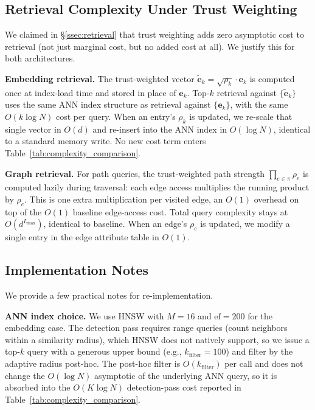 \subsection{Retrieval Complexity Under Trust Weighting}
\label{app:retrieval_complexity}

We claimed in \S\ref{ssec:retrieval} that trust weighting adds zero
asymptotic cost to retrieval (not just marginal cost, but no added
cost at all). We justify this for both architectures.

\textbf{Embedding retrieval.}
The trust-weighted vector $\tilde{\mathbf{e}}_k = \sqrt{\rho_k} \cdot
\mathbf{e}_k$ is computed once at index-load time and stored in place
of $\mathbf{e}_k$. Top-$k$ retrieval against
$\{\tilde{\mathbf{e}}_k\}$ uses the same ANN index structure as
retrieval against $\{\mathbf{e}_k\}$, with the same $O(k \log N)$
cost per query. When an entry's $\rho_k$ is updated, we re-scale that
single vector in $O(d)$ and re-insert into the ANN index in $O(\log
N)$, identical to a standard memory write. No new cost term enters
Table~\ref{tab:complexity_comparison}.

\textbf{Graph retrieval.}
For path queries, the trust-weighted path strength $\prod_{e \in \pi}
\rho_e$ is computed lazily during traversal: each edge access
multiplies the running product by $\rho_e$. This is one extra
multiplication per visited edge, an $O(1)$ overhead on top of the
$O(1)$ baseline edge-access cost. Total query complexity stays at
$O(d^{L_{\max}})$, identical to baseline. When an edge's $\rho_e$ is
updated, we modify a single entry in the edge attribute table in
$O(1)$.

\subsection{Implementation Notes}
\label{app:impl_notes}

We provide a few practical notes for re-implementation.

\textbf{ANN index choice.}
We use HNSW \citep{malkov2018efficient} with $M = 16$ and $\text{ef} =
200$ for the embedding case. The detection pass requires range
queries (count neighbors within a similarity radius), which HNSW does
not natively support, so we issue a top-$k$ query with a generous
upper bound (e.g., $k_{\text{filter}} = 100$) and filter by the
adaptive radius post-hoc. The post-hoc filter is $O(k_{\text{filter}})$
per call and does not change the $O(\log N)$ asymptotic of the
underlying ANN query, so it is absorbed into the $O(K \log N)$
detection-pass cost reported in
Table~\ref{tab:complexity_comparison}.

